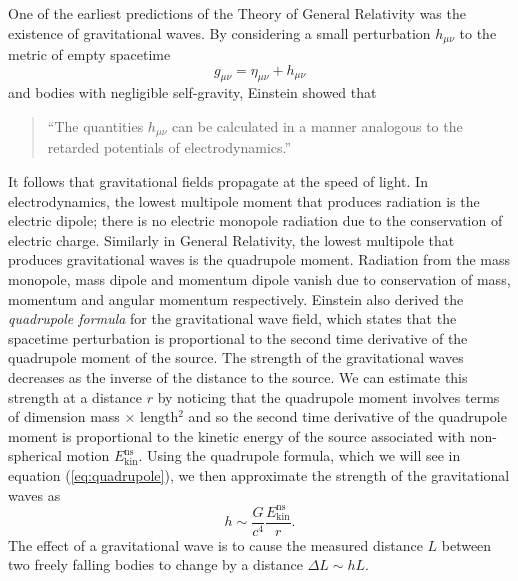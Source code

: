 One of the earliest predictions of the Theory of General Relativity was the
existence of gravitational waves. By considering a small perturbation
$h_{\mu\nu}$ to the metric of empty spacetime
\begin{equation}
g_{\mu\nu} = \eta_{\mu\nu} + h_{\mu\nu}
\end{equation}
and bodies with negligible self-gravity, Einstein showed
that\cite{Einstein:1916}
\begin{quotation}
``The quantities $h_{\mu\nu}$ can be calculated in a manner analogous to the
retarded potentials of electrodynamics.''
\end{quotation}
It follows that
gravitational fields propagate at the speed of light.  In electrodynamics, the
lowest multipole moment that produces radiation is the electric dipole; there
is no electric monopole radiation due to the conservation of electric charge.
Similarly in General Relativity, the lowest multipole that produces
gravitational waves is the quadrupole moment. Radiation from the 
mass monopole, mass dipole and momentum dipole vanish due to conservation of
mass, momentum and angular momentum respectively. Einstein also derived the
\emph{quadrupole formula} for the gravitational wave field, which states that
the spacetime perturbation is proportional to the second time derivative of
the quadrupole moment of the source.  The strength of the gravitational waves
decreases as the inverse of the distance to the source.  We can estimate
this strength at a distance $r$ by noticing that the quadrupole moment
involves terms of dimension mass $\times$ length$^2$ and so the second time
derivative of the quadrupole moment is proportional to the kinetic energy of
the source associated with non-spherical motion $E^\mathrm{ns}_\mathrm{kin}$.
Using the quadrupole formula, which we will see in equation
(\ref{eq:quadrupole}), we then approximate the strength of the gravitational
waves as
\begin{equation}
h \sim \frac{G}{c^4}\frac{E^\mathrm{ns}_\mathrm{kin}}{r}.
\label{eq:strainest}
\end{equation}
The effect of a
gravitational wave is to cause the measured distance $L$ between two freely
falling bodies to change by a distance $\Delta L \sim h L$. 

